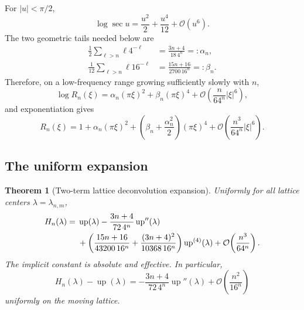 \documentclass[11pt,oneside]{article}
\newtheorem{theorem}{Theorem}[section]
\theoremstyle{definition}
\theoremstyle{remark}
\newcommand{\Up}{\operatorname{up}}
\newcommand{\bigO}{\mathcal O}
\begin{document}
For $|u|<\pi/2$,
\begin{equation}
 \log\sec u=\frac{u^2}{2}+\frac{u^4}{12}+\bigO(u^6).       \label{eq:logsec}
\end{equation}
The two geometric tails needed below are
\begin{align}
 \frac12\sum_{\ell>n}\ell4^{-\ell}
 &=\frac{3n+4}{18\,4^n}=:\alpha_n,                        \label{eq:alpha-n}\\
 \frac1{12}\sum_{\ell>n}\ell16^{-\ell}
 &=\frac{15n+16}{2700\,16^n}=: \beta_n.                  \label{eq:beta-n}
\end{align}
Therefore, on a low-frequency range growing sufficiently slowly with $n$,
\begin{equation}
 \log R_n(\xi)
 =\alpha_n(\pi\xi)^2+\beta_n(\pi\xi)^4
  +\bigO\!\left(\frac{n}{64^n}|\xi|^6\right),            \label{eq:log-Rn}
\end{equation}
and exponentiation gives
\begin{equation}
 R_n(\xi)=1+\alpha_n(\pi\xi)^2
 +\left(\beta_n+\frac{\alpha_n^2}{2}\right)(\pi\xi)^4
 +\bigO\!\left(\frac{n^3}{64^n}|\xi|^6\right).          \label{eq:Rn-expansion}
\end{equation}

\subsection{The uniform expansion}

\begin{theorem}[Two-term lattice deconvolution expansion]
\label{thm:center-expansion}
Uniformly for all lattice centers $\lambda=\lambda_{n,m}$,
\begin{align}
 H_n(\lambda)
={}&\Up(\lambda)
 -\frac{3n+4}{72\,4^n}\Up''(\lambda) \notag\\
 &+\left(
   \frac{15n+16}{43200\,16^n}
  +\frac{(3n+4)^2}{10368\,16^n}
  \right)\Up^{(4)}(\lambda)
 +\bigO\!\left(\frac{n^3}{64^n}\right).                 \label{eq:center-expansion}
\end{align}
The implicit constant is absolute and effective.  In particular,
\begin{equation}
 H_n(\lambda)-\Up(\lambda)
 =-\frac{3n+4}{72\,4^n}\Up''(\lambda)
  +\bigO\!\left(\frac{n^2}{16^n}\right)                 \label{eq:center-leading}
\end{equation}
uniformly on the moving lattice.
\end{theorem}
\end{document}
